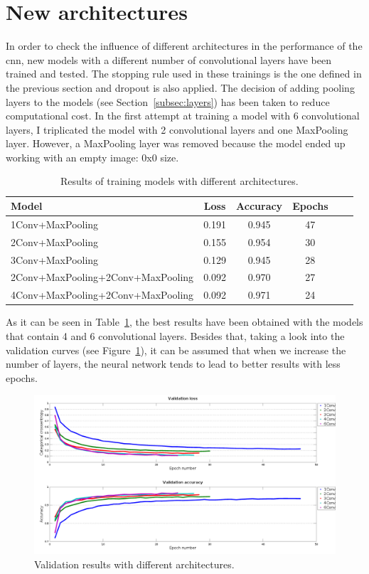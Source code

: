 \section{New architectures}\label{subsec:arch}
In order to check the influence of different architectures in the performance of the \gls{cnn}, new models with a different number of convolutional layers have been trained and tested. The stopping rule used in these trainings is the one defined in the previous section and dropout is also applied. The decision of adding pooling layers to the models (see Section~\ref{subsec:layers}) has been taken to reduce computational cost. In the first attempt at training a model with 6 convolutional layers, I triplicated the model with 2 convolutional layers and one MaxPooling layer. However, a MaxPooling layer was removed because the model ended up working with an empty image: 0x0 size.
\begin{table}
	\centering
	\begin{tabular}{l*{4}{c}r}
		\textbf{Model} & \textbf{Loss} & \textbf{Accuracy} & \textbf{Epochs} \\
		\hline
		1Conv+MaxPooling & 0.191 & 0.945 & 47 \\
		2Conv+MaxPooling & 0.155 & 0.954 & 30 \\
		3Conv+MaxPooling & 0.129 & 0.945 & 28 \\
		2Conv+MaxPooling+2Conv+MaxPooling & 0.092 & 0.970 & 27 \\
		4Conv+MaxPooling+2Conv+MaxPooling & 0.092 & 0.971 & 24 \\
	\end{tabular}
	\caption{Results of training models with different architectures.}
	\label{tbl:arch}
\end{table}

As it can be seen in Table~\ref{tbl:arch}, the best results have been obtained with the models that contain 4 and 6 convolutional layers. Besides that, taking a look into the validation curves (see Figure~\ref{fig:comp_arch}), it can be assumed that when we increase the number of layers, the neural network tends to lead to better results with less epochs.

\begin{figure}
	\centering
	\includegraphics[width=1\linewidth, keepaspectratio]{figures/full_comparison.png}
	\caption{Validation results with different architectures.}
	\label{fig:comp_arch}
\end{figure}

